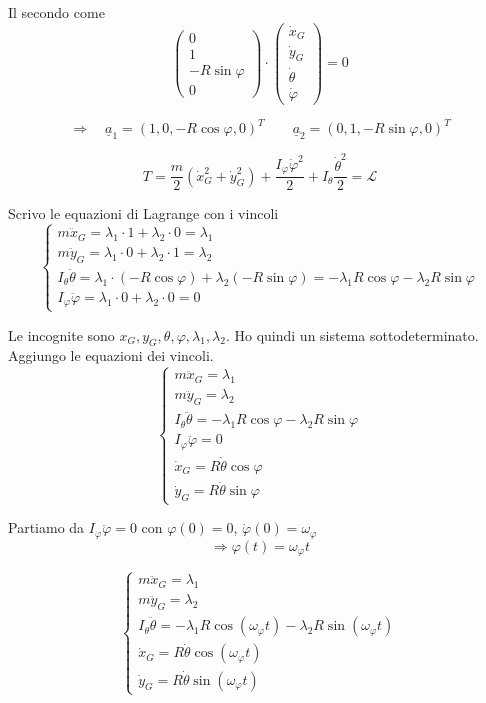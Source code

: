 \begin{example}{}
Il secondo come
\[
\begin{pmatrix}
0\\
1\\
-R\sin\varphi\\
0
\end{pmatrix}
\cdot
\begin{pmatrix}
\dot{x}_G\\
\dot{y}_G\\
\dot{\theta}\\
\dot{\varphi}
\end{pmatrix}
=0
\]

\[
\Rightarrow
\quad
\underline{a}_1=(1,0,-R\cos\varphi,0)^T
\qquad
\underline{a}_2=(0,1,-R\sin\varphi,0)^T
\]

\[
T=
\frac{m}{2}\left(\dot{x}_G^2+\dot{y}_G^2\right)
+
\frac{I_\varphi \dot{\varphi}^2}{2}
+
I_\theta\frac{\dot{\theta}^2}{2}
=
\mathcal{L}
\]

Scrivo le equazioni di Lagrange con i vincoli
\[
\begin{cases}
m\ddot{x}_G=\lambda_1\cdot 1+\lambda_2\cdot 0=\lambda_1\\
m\ddot{y}_G=\lambda_1\cdot 0+\lambda_2\cdot 1=\lambda_2\\
I_\theta\ddot{\theta}
=
\lambda_1\cdot(-R\cos\varphi)+\lambda_2(-R\sin\varphi)
=
-\lambda_1R\cos\varphi-\lambda_2R\sin\varphi\\
I_\varphi\ddot{\varphi}=\lambda_1\cdot 0+\lambda_2\cdot 0=0
\end{cases}
\]

Le incognite sono \(x_G,y_G,\theta,\varphi,\lambda_1,\lambda_2\).
Ho quindi un sistema sottodeterminato. Aggiungo le equazioni dei vincoli.
\[
\begin{cases}
m\ddot{x}_G=\lambda_1\\
m\ddot{y}_G=\lambda_2\\
I_\theta\ddot{\theta}
=
-\lambda_1R\cos\varphi-\lambda_2R\sin\varphi\\
I_\varphi\ddot{\varphi}=0\\
\dot{x}_G=R\dot{\theta}\cos\varphi\\
\dot{y}_G=R\dot{\theta}\sin\varphi
\end{cases}
\]

Partiamo da \(I_\varphi\ddot{\varphi}=0\) con
\(\varphi(0)=0\), \(\dot{\varphi}(0)=\omega_\varphi\)
\[
\Rightarrow
\varphi(t)=\omega_\varphi t
\]

\[
\begin{cases}
m\ddot{x}_G=\lambda_1\\
m\ddot{y}_G=\lambda_2\\
I_\theta\ddot{\theta}
=
-\lambda_1R\cos(\omega_\varphi t)
-\lambda_2R\sin(\omega_\varphi t)\\
\dot{x}_G=R\dot{\theta}\cos(\omega_\varphi t)\\
\dot{y}_G=R\dot{\theta}\sin(\omega_\varphi t)
\end{cases}
\]


\end{example}
